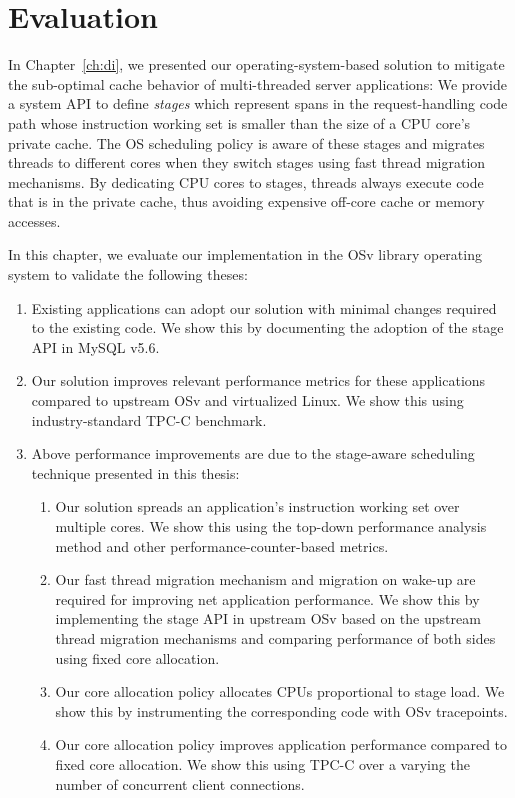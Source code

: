 \documentclass[12pt,a4paper]{book}
\begin{document}
\chapter{Evaluation}\label{ch:eval}
In Chapter~\ref{ch:di}, we presented our operating-system-based solution to mitigate the sub-optimal cache behavior of multi-threaded server applications:
We provide a system API to define \emph{stages} which represent spans in the request-handling code path whose instruction working set is smaller than the size of a CPU core's private cache.
The OS scheduling policy is aware of these stages and migrates threads to different cores when they switch stages using fast thread migration mechanisms.
By dedicating CPU cores to stages, threads always execute code that is in the private cache, thus avoiding expensive off-core cache or memory accesses.

In this chapter, we evaluate our implementation in the OSv library operating system to validate the following theses:
\begin{enumerate}
    \item Existing applications can adopt our solution with minimal changes required to the existing code.
        We show this by documenting the adoption of the stage API in MySQL v5.6.
    \item Our solution improves relevant performance metrics for these applications compared to upstream OSv and virtualized Linux.
        We show this using industry-standard TPC-C benchmark.
    \item Above performance improvements are due to the stage-aware scheduling technique presented in this thesis:
    \begin{enumerate}
        \item Our solution spreads an application's instruction working set over multiple cores.
            We show this using the top-down performance analysis method and other performance-counter-based metrics.
        \item Our fast thread migration mechanism and migration on wake-up are required for improving net application performance.
            We show this by implementing the stage API in upstream OSv based on the upstream thread migration mechanisms and comparing performance of both sides using fixed core allocation.
        \item Our core allocation policy allocates CPUs proportional to stage load.
            We show this by instrumenting the corresponding code with OSv tracepoints.
        \item Our core allocation policy improves application performance compared to fixed core allocation.
            We show this using TPC-C over a varying the number of concurrent client connections.
    \end{enumerate}
\end{enumerate}
\end{document}
